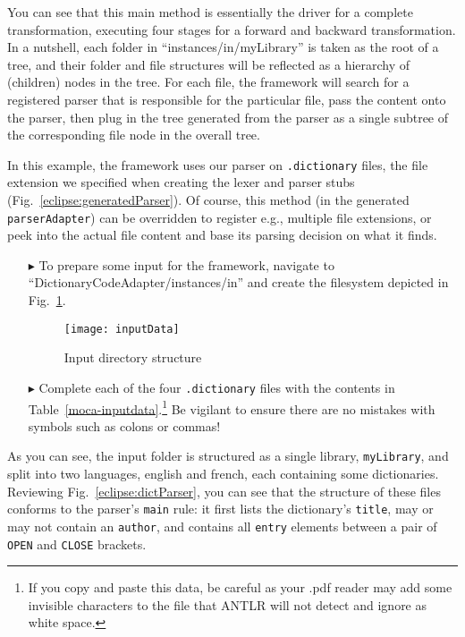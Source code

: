 You can see that this main method is essentially the driver for a complete
transformation, executing four stages for a forward and backward transformation.
In a nutshell, each folder in ``instances/in/myLibrary'' is taken as the root of a tree, and their folder and file structures will be reflected as a hierarchy of (children) nodes in the tree. For each file, the framework will search for a registered parser that is responsible for the particular file, pass the content
onto the parser, then plug in the tree generated from the parser as a single subtree of the corresponding file node in the overall tree.

In this example, the framework uses our parser on \texttt{.dictionary} files, the file extension we specified when creating the lexer and parser stubs
(Fig.~\ref{eclipse:generatedParser}). Of course, this method (in the generated \texttt{parserAdapter}) can be overridden to register e.g., multiple
file extensions, or peek into the actual file content and base its parsing decision on what it finds.

\begin{itemize}

\item[$\blacktriangleright$] To prepare some input for the framework, navigate to ``Dict\-ion\-ar\-y\-Code\-Adap\-ter\-/in\-stan\-ces\-/in'' and create the
filesystem depicted in \\ Fig.~\ref{eclipse:textDirectory}. 

\begin{figure}[htp]
\begin{center}
  \texttt{[image: inputData]}
  \caption{Input directory structure}
  \label{eclipse:textDirectory}
\end{center}
\end{figure}

\item[$\blacktriangleright$] Complete each of the four \texttt{.dictionary} files with the contents in Table~\ref{moca-inputdata}.\footnote{If you copy and
paste this data, be careful as your .pdf reader may add some invisible characters to the file that ANTLR will not detect and ignore as white space.} 
Be vigilant to ensure there are no mistakes with symbols such as colons or commas!

\end{itemize}

As you can see, the input folder is structured as a single library, \texttt{myLibrary}, and split into two languages, english and french, each containing
some dictionaries. Reviewing Fig.~\ref{eclipse:dictParser}, you can see that the structure of these files conforms to the parser's \texttt{main} rule: it
first lists the dictionary's \texttt{title}, may or may not contain an \texttt{author}, and contains all \texttt{entry} elements between a pair of \texttt{OPEN}
and \texttt{CLOSE} brackets.

